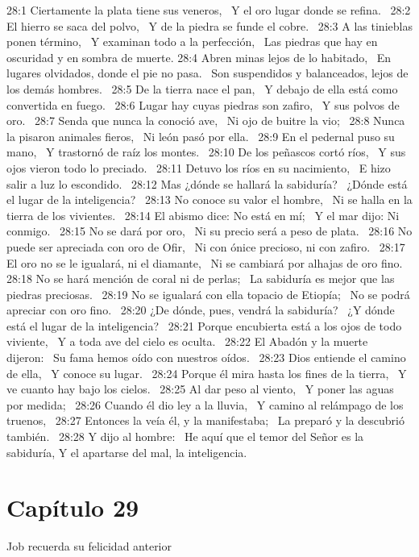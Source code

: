 28:1 Ciertamente la plata tiene sus veneros,  
Y el oro lugar donde se refina.  
28:2 El hierro se saca del polvo,  
Y de la piedra se funde el cobre.  
28:3 A las tinieblas ponen término,  
Y examinan todo a la perfección,  
Las piedras que hay en oscuridad y en sombra de muerte. 
28:4 Abren minas lejos de lo habitado,  
En lugares olvidados, donde el pie no pasa.  
Son suspendidos y balanceados, lejos de los demás hombres.  
28:5 De la tierra nace el pan,  
Y debajo de ella está como convertida en fuego.  
28:6 Lugar hay cuyas piedras son zafiro,  
Y sus polvos de oro.  
28:7 Senda que nunca la conoció ave,  
Ni ojo de buitre la vio;  
28:8 Nunca la pisaron animales fieros,  
Ni león pasó por ella.  
28:9 En el pedernal puso su mano,  
Y trastornó de raíz los montes.  
28:10 De los peñascos cortó ríos,  
Y sus ojos vieron todo lo preciado.  
28:11 Detuvo los ríos en su nacimiento,  
E hizo salir a luz lo escondido.  
28:12 Mas ¿dónde se hallará la sabiduría?  
¿Dónde está el lugar de la inteligencia?  
28:13 No conoce su valor el hombre,  
Ni se halla en la tierra de los vivientes.  
28:14 El abismo dice: No está en mí;  
Y el mar dijo: Ni conmigo.  
28:15 No se dará por oro,  
Ni su precio será a peso de plata.  
28:16 No puede ser apreciada con oro de Ofir,  
Ni con ónice precioso, ni con zafiro.  
28:17 El oro no se le igualará, ni el diamante,  
Ni se cambiará por alhajas de oro fino.  
28:18 No se hará mención de coral ni de perlas;  
La sabiduría es mejor que las piedras preciosas.  
28:19 No se igualará con ella topacio de Etiopía;  
No se podrá apreciar con oro fino.  
28:20 ¿De dónde, pues, vendrá la sabiduría?  
¿Y dónde está el lugar de la inteligencia?  
28:21 Porque encubierta está a los ojos de todo viviente,  
Y a toda ave del cielo es oculta.  
28:22 El Abadón y la muerte dijeron:  
Su fama hemos oído con nuestros oídos.  
28:23 Dios entiende el camino de ella,  
Y conoce su lugar.  
28:24 Porque él mira hasta los fines de la tierra,  
Y ve cuanto hay bajo los cielos.  
28:25 Al dar peso al viento,  
Y poner las aguas por medida;  
28:26 Cuando él dio ley a la lluvia,  
Y camino al relámpago de los truenos,  
28:27 Entonces la veía él, y la manifestaba;  
La preparó y la descubrió también.  
28:28 Y dijo al hombre:  
He aquí que el temor del Señor es la sabiduría, 
Y el apartarse del mal, la inteligencia.  
\section*{Capítulo 29}
Job recuerda su felicidad anterior  

